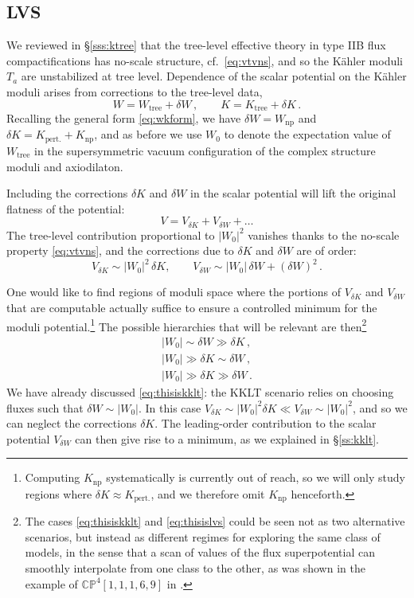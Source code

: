 \documentclass[12pt,a4wide]{article}
\def\be{\begin{equation}}
\def\ee{\end{equation}}
\begin{document}
\subsection{LVS}\label{ss:lvs}
 


We reviewed in \S\ref{sss:ktree} that the tree-level effective theory in type IIB flux compactifications has no-scale structure, cf.~\eqref{eq:vtvns}, and so the K\"ahler moduli $T_a$ are unstabilized at tree level.  Dependence of the scalar potential on the K\"ahler moduli arises from corrections to the tree-level data,
\begin{equation}
W = W_{\text{tree}} + \delta W\,, \qquad K = K_{\text{tree}} + \delta K\,.
\end{equation}
Recalling the general form \eqref{eq:wkform}, we have $\delta W = W_{\text{np}}$ and $\delta K = K_{\text{pert.}}+K_{\text{np}}$, and as before we use $W_0$ to denote the expectation value of $W_{\text{tree}}$ in the supersymmetric vacuum configuration of the complex structure moduli and axiodilaton.

Including the corrections $\delta K$ and $\delta W$ in the  scalar potential will lift the original flatness of the potential:
\be
V= V_{\delta K} + V_{\delta W}+\ldots  
\ee
The tree-level contribution proportional to $|W_0|^2$ vanishes thanks to the no-scale property \eqref{eq:vtvns}, and the corrections due to $\delta K$ and $\delta W$ are of order:
\be
V_{\delta K}\sim |W_0|^2\,\delta K, \qquad V_{\delta W}\sim |W_0|\,\delta W+(\delta W)^2\,.
\ee



One would like to find regions of moduli space where the portions of $V_{\delta K}$ and $V_{\delta W}$ that are computable actually suffice to ensure a controlled minimum for the moduli potential.\footnote{Computing $K_{\text{np}}$ systematically is currently out of reach, so we will only study regions where $\delta K \approx K_{\text{pert.}}$, and we therefore omit $K_{\text{np}}$ henceforth.}
The possible hierarchies that will be relevant are then\footnote{The cases
\eqref{eq:thisiskklt} and \eqref{eq:thisislvs} could be seen not as two alternative scenarios, but instead as different regimes for exploring the same class of models, in the sense that a scan of values of the flux superpotential can smoothly interpolate from one class  to the other, as was shown in the example of $\mathbb{C}{\mathbb P}^4[{1,1,1,6,9}]$ in \cite{AbdusSalam:2007pm}.}
\begin{eqnarray}
|W_0| \sim\delta W \gg \delta K\,,    \label{eq:thisiskklt} \\ 
|W_0|  \gg \delta K \sim \delta W\,,    \label{eq:thisislvs}\\
|W_0|  \gg \delta K \gg \delta W     \label{eq:thisispertk}\,.  
\end{eqnarray} 
We have already discussed \eqref{eq:thisiskklt}: the KKLT scenario relies on choosing fluxes such that $\delta W\sim |W_0|$. 
In this case $V_{\delta K}\sim  |W_0|^2 \delta K\ll V_{\delta W}\sim |W_0|^2$, and so we can neglect the corrections $\delta K$. 
The leading-order contribution to the scalar potential $V_{\delta W}$ can then give rise to  a minimum, as we explained in \S\ref{ss:kklt}.
\end{document}
